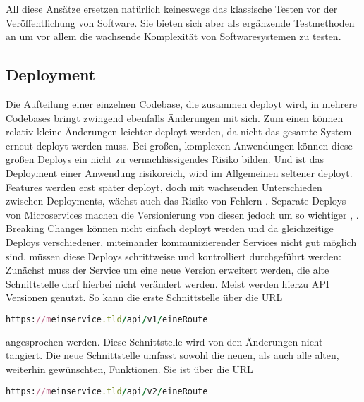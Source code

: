 All diese Ansätze ersetzen natürlich keineswegs das klassische Testen vor der Veröffentlichung von Software. Sie bieten sich aber als ergänzende Testmethoden an um vor allem die wachsende Komplexität von Softwaresystemen zu testen.

\subsection{Deployment}
Die Aufteilung einer einzelnen Codebase, die zusammen deployt wird, in mehrere Codebases bringt zwingend ebenfalls Änderungen mit sich.
Zum einen können relativ kleine Änderungen leichter deployt werden, da nicht das gesamte System erneut deployt werden muss. Bei großen, komplexen Anwendungen können diese großen Deploys ein nicht zu vernachlässigendes Risiko bilden. Und ist das Deployment einer Anwendung risikoreich, wird im Allgemeinen seltener deployt. Features werden erst später deployt, doch mit wachsenden Unterschieden zwischen Deployments, wächst auch das Risiko von Fehlern \cite[vgl.][Seite 6]{newman2015building}.
Separate Deploys von Microservices machen die Versionierung von diesen jedoch um so wichtiger \cite[vgl.][Seite 62]{newman2015building}, \cite[vgl.][]{Vergleichsartikel}. Breaking Changes können nicht einfach deployt werden und da gleichzeitige Deploys verschiedener, miteinander kommunizierender Services nicht gut möglich sind, müssen diese Deploys schrittweise und kontrolliert durchgeführt werden: Zunächst muss der Service um eine neue Version erweitert werden, die alte Schnittstelle darf hierbei nicht verändert werden. Meist werden hierzu API Versionen genutzt. So kann die erste Schnittstelle über die URL

\begin{lstlisting}[language=Ruby]
https://meinservice.tld/api/v1/eineRoute
\end{lstlisting}

\noindent angesprochen werden. Diese Schnittstelle wird von den Änderungen nicht tangiert. Die neue Schnittstelle umfasst sowohl die neuen, als auch alle alten, weiterhin gewünschten, Funktionen. Sie ist über die URL

\begin{lstlisting}[language=Ruby]
https://meinservice.tld/api/v2/eineRoute
\end{lstlisting}

